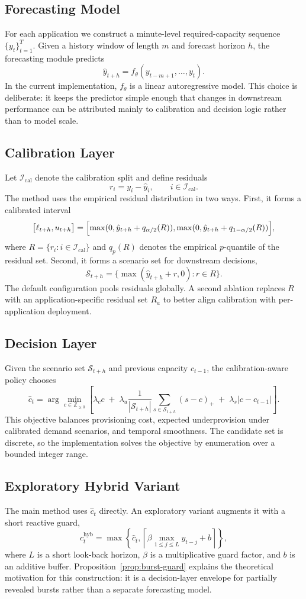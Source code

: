 \documentclass[11pt]{article}
\theoremstyle{plain}
\theoremstyle{definition}
\theoremstyle{remark}
\begin{document}
\subsection{Forecasting Model}
For each application we construct a minute-level required-capacity sequence $\{y_t\}_{t=1}^T$. Given a history window of length $m$ and forecast horizon $h$, the forecasting module predicts
\[
\hat y_{t+h} = f_{\theta}(y_{t-m+1}, \ldots, y_t).
\]
In the current implementation, $f_\theta$ is a linear autoregressive model. This choice is deliberate: it keeps the predictor simple enough that changes in downstream performance can be attributed mainly to calibration and decision logic rather than to model scale.

\subsection{Calibration Layer}
Let $\mathcal{I}_{\mathrm{cal}}$ denote the calibration split and define residuals
\[
r_i = y_i - \hat y_i, \qquad i \in \mathcal{I}_{\mathrm{cal}}.
\]
The method uses the empirical residual distribution in two ways. First, it forms a calibrated interval
\[
\bigl[\ell_{t+h}, u_{t+h}\bigr]
=
\Bigl[
\max(0,\hat y_{t+h}+q_{\alpha/2}(R)),
\max(0,\hat y_{t+h}+q_{1-\alpha/2}(R))
\Bigr],
\]
where $R=\{r_i : i\in\mathcal{I}_{\mathrm{cal}}\}$ and $q_p(R)$ denotes the empirical $p$-quantile of the residual set. Second, it forms a scenario set for downstream decisions,
\[
\mathcal{S}_{t+h} = \{\max(\hat y_{t+h}+r,0): r \in R\}.
\]
The default configuration pools residuals globally. A second ablation replaces $R$ with an application-specific residual set $R_a$ to better align calibration with per-application deployment.

\subsection{Decision Layer}
Given the scenario set $\mathcal{S}_{t+h}$ and previous capacity $c_{t-1}$, the calibration-aware policy chooses
\[
\hat c_t
=
\arg\min_{c \in \mathbb{Z}_{\ge 0}}
\left[
\lambda_c c
\;+\;
\lambda_u \frac{1}{|\mathcal{S}_{t+h}|} \sum_{s \in \mathcal{S}_{t+h}} (s-c)_+
\;+\;
\lambda_s |c-c_{t-1}|
\right].
\]
This objective balances provisioning cost, expected underprovision under calibrated demand scenarios, and temporal smoothness. The candidate set is discrete, so the implementation solves the objective by enumeration over a bounded integer range.

\subsection{Exploratory Hybrid Variant}
The main method uses $\hat c_t$ directly. An exploratory variant augments it with a short reactive guard,
\[
c_t^{\mathrm{hyb}} = \max\!\left\{\hat c_t,\left\lceil \beta \max_{1 \le j \le L} y_{t-j} + b \right\rceil\right\},
\]
where $L$ is a short look-back horizon, $\beta$ is a multiplicative guard factor, and $b$ is an additive buffer. Proposition~\ref{prop:burst-guard} explains the theoretical motivation for this construction: it is a decision-layer envelope for partially revealed bursts rather than a separate forecasting model.
\end{document}
